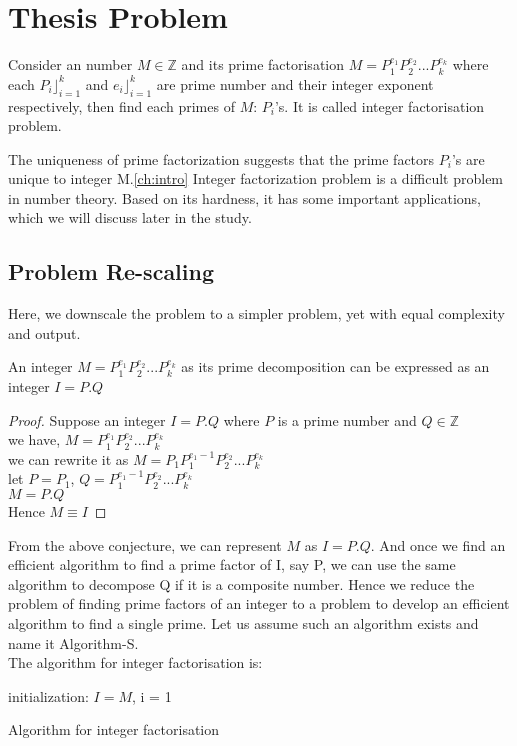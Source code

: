 \section{Thesis Problem}
Consider an number $M \in \mathbb{Z}$ and its prime factorisation $M=P_1^{e_1}P_2^{e_2} . . . P_k^{e_k}$ where each $P_i \rfloor_{i=1}^k$ and $e_i \rfloor_{i=1}^k$ are prime number and their integer exponent respectively, then find each primes of $M$: $P_i$'s. It is called integer factorisation problem.

The uniqueness of prime factorization suggests that the prime factors $P_i$'s are unique to integer M.\ref{ch:intro} Integer factorization problem is a difficult problem in number theory. Based on its hardness, it has some important applications, which we will discuss later in the study.

\subsection{Problem Re-scaling}
Here, we downscale the problem to a simpler problem, yet with equal complexity and output.
\begin{conj}
    An integer $M=P_1^{e_1}P_2^{e_2} . . . P_k^{e_k}$ as its prime decomposition can be expressed as an integer $I= P.Q$ 
\end{conj}
\begin{proof}
    Suppose an integer $I= P.Q$ where $P$ is a prime number and $Q \in \mathbb{Z}$
    \\ we have, $M=P_1^{e_1}P_2^{e_2} . . . P_k^{e_k}$
    \\we can rewrite it as  $M=P_1 P_1^{e_1 -1}P_2^{e_2} . . . P_k^{e_k}$
    \\let $P=P_1$, $ Q= P_1^{e_1 -1}P_2^{e_2} . . . P_k^{e_k}$
    \\ $M=P.Q$
    \\Hence $M \equiv I$
\end{proof}

From the above conjecture, we can represent $M$ as $I=P.Q$. And once we find an efficient algorithm to find a prime factor of I, say P, we can use the same algorithm to decompose Q if it is a composite number. Hence we reduce the problem of finding prime factors of an integer to a problem to develop an efficient algorithm to find a single prime. Let us assume such an algorithm exists and name it Algorithm-S.
\\The algorithm for integer factorisation is:

\begin{algorithm}[H]
  initialization: $I = M$, i = 1\;
  \caption{Algorithm for integer factorisation}
\end{algorithm}
